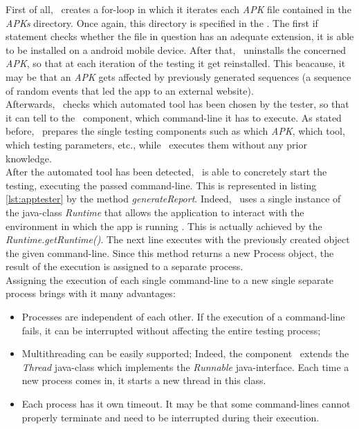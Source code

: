 First of all, \AppTester\ creates a for-loop in which it iterates each \textit{APK} file contained in the \textit{APKs} directory. Once again, this directory is specified in the \Config. 
The first if statement checks whether the file in question has an adequate extension, \ie it is able to be installed on a android mobile device. After that, \AppTester\ uninstalls the concerned \textit{APK}, so that at each iteration of the testing it get reinstalled. This beacause, it may be that an \textit{APK} gets affected by previously generated sequences (\eg a sequence of random events that led the app to an external website). \\
Afterwards, \AppTester\ checks which automated tool has been chosen by the tester, so that it can tell to the \Cmd\ component, which command-line it has to execute. As stated before, \AppTester\ prepares the single testing components such as which \textit{APK}, which tool, which testing parameters, etc., while \Cmd\ executes them without any prior knowledge. \\
After the automated tool has been detected, \Cmd\ is able to concretely start the testing, executing the passed command-line. This is represented in listing \ref{lst:apptester} by the method \textit{generateReport}. Indeed, \Cmd\ uses a single instance of the java-class \textit{Runtime} that allows the application to interact with the environment in which the app is running \cite{runtime}. This is actually achieved by the \textit{Runtime.getRuntime()}. The next line executes with the previously created object the given command-line. Since this method returns a new Process object, the result of the execution is assigned to a separate process. \\
Assigning the execution of each single command-line to a new single separate process brings with it many advantages: 
\begin{itemize}
\item Processes are independent of each other. If the execution of a command-line fails, it can be interrupted without affecting the entire testing process; 
\item Multithreading can be easily supported; Indeed, the component \Stream\ extends the \textit{Thread} java-class which implements the \textit{Runnable} java-interface. Each time a new process comes in, it starts a new thread in this class.
\item Each process has it own timeout. It may be that some command-lines cannot properly terminate and need to be interrupted during their execution.  
\end{itemize}
